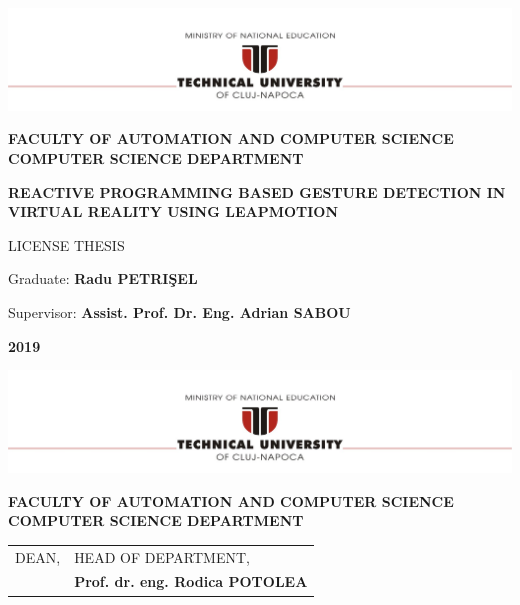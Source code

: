\documentclass[12pt,a4paper,twoside]{report}
\renewcommand{\thesisauthor}{Radu PETRI\c{S}EL}    %
\renewcommand{\thesisyear}{2019}      %
\renewcommand{\thesistitle}{REACTIVE PROGRAMMING BASED GESTURE DETECTION IN VIRTUAL REALITY USING LEAPMOTION}
\renewcommand{\thesissupervisor}{Assist. Prof. Dr. Eng. Adrian SABOU}
\newcommand{\department}{\bf FACULTY OF AUTOMATION AND COMPUTER SCIENCE\\
COMPUTER SCIENCE DEPARTMENT}
\newcommand{\thesis}{LICENSE THESIS}
\newcommand{\utcnlogo}{\includegraphics[width=15cm]{img/tucn.jpg}}
\begin{document}

\newenvironment{definition}[1][Defini\c{t}ie.]{\begin{trivlist}
\item[\hskip \labelsep {\bfseries #1}]}{\end{trivlist}}


\setcounter{secnumdepth}{3}

\setcounter{page}{1}

\begin{center}
\utcnlogo

\department

\vspace{4cm}

{\bf \thesistitle} %

\vspace{1.5cm}

\thesis
\vspace{5.75cm}

Graduate: {\bf \thesisauthor{}} 

Supervisor: {\bf \thesissupervisor{}}

\vspace{3cm}
{\bf \thesisyear}
\end{center}

\thispagestyle{empty}
\newpage

\begin{center}
\utcnlogo

\department

\end{center}
\vspace{0.5cm}

\begin{tabular}{p{7cm}p{8cm}}
 \hspace{-1cm}DEAN, & HEAD OF DEPARTMENT,\\
 \hspace{-1cm}{\bf Prof. dr. eng. Liviu MICLEA} & {\bf Prof. dr. eng. Rodica POTOLEA}\\  
\end{tabular}
 
\vspace{2cm}
\end{document}
